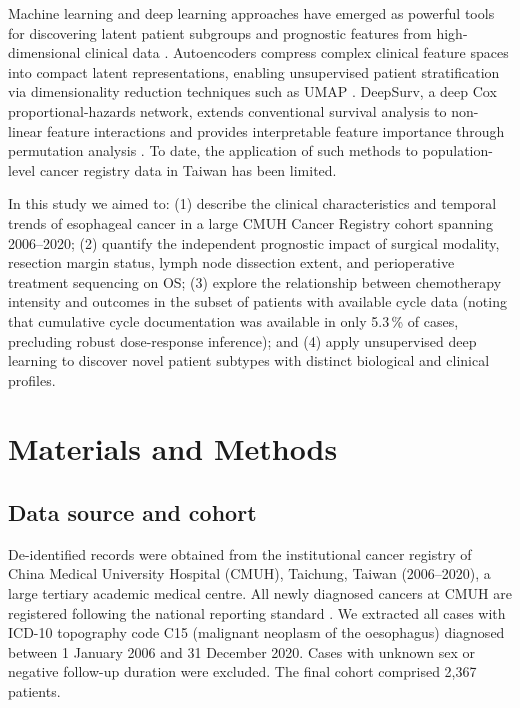 \documentclass[12pt,a4paper]{article}
\begin{document}
Machine learning and deep learning approaches have emerged as powerful
tools for discovering latent patient subgroups and prognostic features from
high-dimensional clinical data \cite{Kourou2015}. Autoencoders compress
complex clinical feature spaces into compact latent representations,
enabling unsupervised patient stratification via dimensionality reduction
techniques such as UMAP \cite{McInnes2018}. DeepSurv, a deep Cox
proportional-hazards network, extends conventional survival analysis to
non-linear feature interactions and provides interpretable feature
importance through permutation analysis \cite{Katzman2018}. To date, the
application of such methods to population-level cancer registry data in
Taiwan has been limited.

In this study we aimed to: (1) describe the clinical characteristics and
temporal trends of esophageal cancer in a large CMUH Cancer Registry
cohort spanning 2006--2020; (2) quantify the independent prognostic impact
of surgical modality, resection margin status, lymph node dissection extent,
and perioperative treatment sequencing on OS; (3) explore the relationship
between chemotherapy intensity and outcomes in the subset of patients with
available cycle data (noting that cumulative cycle documentation was
available in only 5.3\,\% of cases, precluding robust dose-response
inference); and (4) apply unsupervised deep learning to discover novel
patient subtypes with distinct biological and clinical profiles.

\section{Materials and Methods}

\subsection{Data source and cohort}
De-identified records were obtained from the institutional cancer registry
of China Medical University Hospital (CMUH), Taichung, Taiwan (2006--2020),
a large tertiary academic medical centre. All newly diagnosed cancers at
CMUH are registered following the national reporting standard
\cite{MHW2022registry}. We extracted all cases with ICD-10 topography code
C15 (malignant neoplasm of the oesophagus) diagnosed between 1 January 2006
and 31 December 2020. Cases with unknown sex or negative follow-up duration
were excluded. The final cohort comprised 2,367 patients.
\end{document}
